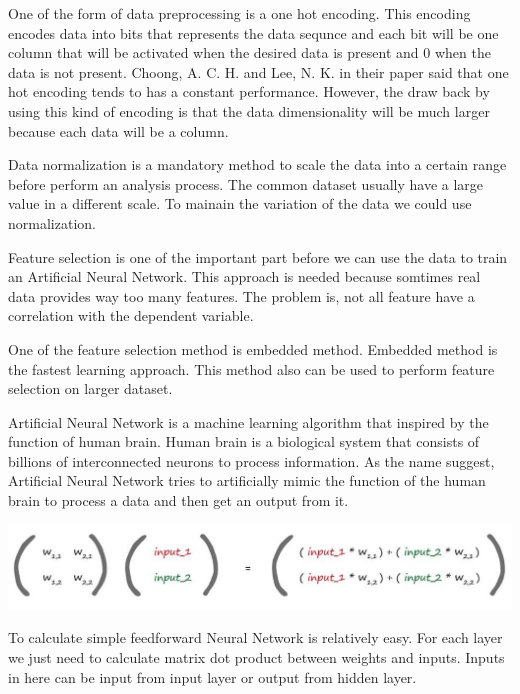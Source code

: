 \documentclass[a4paper, 12pt]{article}
\begin{document}
\begin{multicols}{2}
One of the form of data preprocessing is a one hot encoding. This encoding encodes data into bits that represents the data sequnce and each bit will be one column that will be activated when the desired data is present and 0 when the data is not present. Choong, A. C. H. and Lee, N. K. in their paper said that one hot encoding tends to has a constant performance. However, the draw back by using this kind of encoding is that the data dimensionality will be much larger because each data will
  be a column. \cite{choong2017} 

Data normalization is a mandatory method to scale the data into a certain range before perform an analysis process. The common dataset usually have a large value in a different scale. To mainain the variation of the data we could use normalization. \cite{patro2015}

  Feature selection is one of the important part before we can use the data to train an Artificial Neural Network. This approach is needed because somtimes real data provides way too many features. The problem is, not all feature have a correlation with the dependent variable. \cite{kira1992} 

  One of the feature selection method is embedded method. Embedded method is the fastest learning approach. This method also can be used to perform feature selection on larger dataset. \cite{lal2006}

  Artificial Neural Network is a machine learning algorithm that inspired by the function of human brain. Human brain is a biological system that consists of billions of interconnected neurons to process information. As the name suggest, Artificial Neural Network tries to artificially mimic the function of the human brain to process a data and then get an output from it. \cite{wan2003}

\centering
\vspace{0.2cm}
\includegraphics[scale=0.155]{nn_matrix}
\vspace{0.2cm}

\justifying
  To calculate simple feedforward Neural Network is relatively easy. For each layer we just need to calculate matrix dot product between weights and inputs. Inputs in here can be input from input layer or output from hidden layer. \cite{tariq2016}


\end{multicols}
\end{document}
